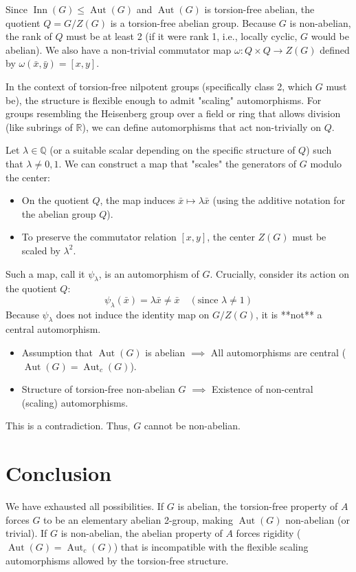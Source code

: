 \documentclass{book}
\newcommand{\Q}{{\mathbb{Q}}}
\newcommand{\R}{{\mathbb{R}}}
\newcommand{\Aut}{{\operatorname{Aut}}}
\newcommand{\Inn}{{\operatorname{Inn}}}
\begin{document}
Since $\Inn(G) \le \Aut(G)$ and $\Aut(G)$ is torsion-free abelian, the quotient $Q = G/Z(G)$ is a torsion-free abelian group. Because $G$ is non-abelian, the rank of $Q$ must be at least 2 (if it were rank 1, i.e., locally cyclic, $G$ would be abelian).
We also have a non-trivial commutator map $\omega: Q \times Q \to Z(G)$ defined by $\omega(\bar{x}, \bar{y}) = [x, y]$.

In the context of torsion-free nilpotent groups (specifically class 2, which $G$ must be), the structure is flexible enough to admit "scaling" automorphisms. For groups resembling the Heisenberg group over a field or ring that allows division (like subrings of $\R$), we can define automorphisms that act non-trivially on $Q$.

Let $\lambda \in \Q$ (or a suitable scalar depending on the specific structure of $Q$) such that $\lambda \neq 0, 1$. We can construct a map that "scales" the generators of $G$ modulo the center:
\begin{itemize}
    \item On the quotient $Q$, the map induces $\bar{x} \mapsto \lambda \bar{x}$ (using the additive notation for the abelian group $Q$).
    \item To preserve the commutator relation $[x, y]$, the center $Z(G)$ must be scaled by $\lambda^2$.
\end{itemize}
Such a map, call it $\psi_\lambda$, is an automorphism of $G$. Crucially, consider its action on the quotient $Q$:
\[
    \psi_\lambda(\bar{x}) = \lambda \bar{x} \neq \bar{x} \quad (\text{since } \lambda \neq 1)
\]
Because $\psi_\lambda$ does not induce the identity map on $G/Z(G)$, it is **not** a central automorphism.

\begin{itemize}
    \item Assumption that $\Aut(G)$ is abelian $\implies$ All automorphisms are central ($\Aut(G) = \Aut_c(G)$).
    \item Structure of torsion-free non-abelian $G$ $\implies$ Existence of non-central (scaling) automorphisms.
\end{itemize}

This is a contradiction. Thus, $G$ cannot be non-abelian.

\section{Conclusion}

We have exhausted all possibilities. If $G$ is abelian, the torsion-free property of $A$ forces $G$ to be an elementary abelian 2-group, making $\Aut(G)$ non-abelian (or trivial). If $G$ is non-abelian, the abelian property of $A$ forces rigidity ($\Aut(G) = \Aut_c(G)$) that is incompatible with the flexible scaling automorphisms allowed by the torsion-free structure.
\end{document}
